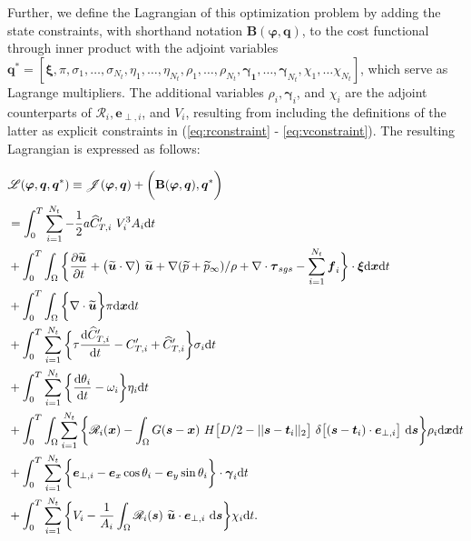 \documentclass[energies,article,submit,moreauthors,latex,10pt,a4paper]{mdpi}
\newcommand{\revision}[1]{{\color{red} #1}}
\newcommand{\ds}{~\text{d}\boldsymbol{s}}
\newcommand{\bs}[1]{\boldsymbol{#1}}
\newcommand{\dx}{\text{d}\boldsymbol{x}}
\newcommand{\dt}{\text{d}t}
\newcommand{\ddt}[1]{\frac{\text{d} #1}{\text{d} t}}
\newcommand{\stint}{\int_{0}^{T} \int_{\Omega}}
\newcommand{\sint}{\int_{\Omega}}
\newcommand{\Tint}{\int_{0}^{T}}
\newcommand{\utilde}{\widetilde{\bs{u}}}
\newcommand{\ptilde}{\widetilde{p}}
\newcommand{\ctihat}{\widehat{C}_{T,i}'}
\newcommand{\cti}{C_{T,i}'}
\newcommand{\R}{\mathscr{R}}
\newcommand{\J}{\mathscr{J}}
\newcommand{\eperpi}{\bs{e}_{\perp,i}}
\newcommand{\vi}{\frac{1}{A_i} \sint \R_i (\bs{s})~\utilde \cdot \eperpi \ds}
\newcommand{\innerproduct}[2]{\bigg( #1, #2 \bigg)}
\newcommand{\sumturbines}{\sum_{i=1}^{N_t}}
\newcommand{\diracdelta}{{\delta}}
\begin{document}
\noindent Further, we define the Lagrangian of this optimization problem by adding the state constraints, with shorthand notation $\bs{B}(\bs{\varphi}, \bs{q})$, to the cost functional through inner product with the adjoint variables \revision{$\bs{q}^* = [\bs{\xi}, \pi, \sigma_1, \dots, \sigma_{N_t}, \eta_1, \dots, \eta_{N_t}, \rho_1, \dots, \rho_{N_t}, \bs{\gamma_1}, \dots, \bs{\gamma}_{N_t}, \chi_1, \dots \chi_{N_t}]$, which serve as Lagrange multipliers. The additional variables $\rho_i, \bs{\gamma}_i$, and $\chi_i$ are the adjoint counterparts of $\R_i, \eperpi$, and $V_i$, resulting from including the definitions of the latter as explicit constraints in (\ref{eq:rconstraint} - \ref{eq:vconstraint}). The resulting Lagrangian is expressed as follows:}

\begin{align}
&\mathscr{L}(\bs{\varphi}, \bs{q}, \bs{q}^*) \equiv \J(\bs{\varphi}, \bs{q}) + \innerproduct{\bf{B}(\bs{\varphi}, \bs{q})}{\bs{q}^*} \nonumber\\
&= \Tint \sum_{i=1}^{N_t} - \frac{1}{2} a \ctihat~V_i^3 A_i \dt \nonumber\\
&+ \stint \bigg\{ \frac{\partial \utilde}{\partial t} + \big(\utilde \cdot \nabla \big)~ \utilde + \nabla (\ptilde + \ptilde_\infty) / \rho + \nabla \cdot \boldsymbol{\tau}_{sgs}  - \sum_{i=1}^{N_t} \bs{f}_i \bigg\} \cdot \bs{\xi} \dx \dt \nonumber\\
&+ \stint \bigg\{ \nabla \cdot \utilde \bigg\} \pi \dx \dt \nonumber\\
&+ \Tint \sumturbines \bigg\{  \tau \ddt{\ctihat} - \cti + \ctihat \bigg\} \sigma_i \dt  \nonumber\\
&+ \Tint \sumturbines \bigg\{ \ddt{\theta_i} - \omega_i \bigg\} \eta_i\dt \nonumber\\
&+ \stint \sumturbines \bigg\{ \R_i(\bs{x}) - \sint G(\bs{s} - \bs{x})~H\big[D/2 - \vert\vert \bs{s} - \bs{t}_i \vert\vert_2\big]~\diracdelta \big[ (\bs{s} - \bs{t}_i)\cdot \eperpi \big] \ds \bigg\} \rho_i \dx \dt \nonumber\\
&+ \Tint \sumturbines \bigg\{ \eperpi - \bs{e}_x \cos \theta_i  - \bs{e}_y \sin \theta_i \bigg\} \cdot \bs{\gamma}_i \dt \nonumber \label{eq:lagrangian_derivation}\\
&+ \Tint \sumturbines \bigg\{ V_i - \vi \bigg\} \chi_i \dt .
\end{align}
\end{document}
